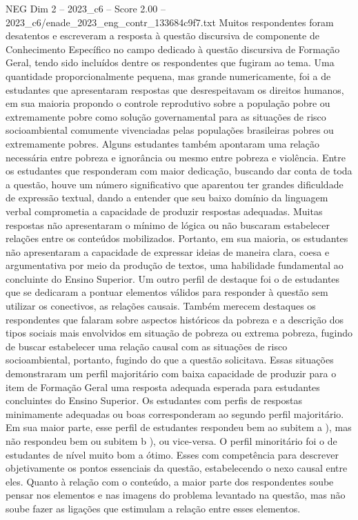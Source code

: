 \begin{textsample}{NEG Dim 2 – 2023\_c6 – Score 2.00 – 2023\_c6/enade\_2023\_eng\_contr\_133684c9f7.txt}
Muitos respondentes foram desatentos e escreveram a resposta à questão discursiva de componente de Conhecimento Específico no campo dedicado à questão discursiva de Formação Geral, tendo sido incluídos dentre os respondentes que fugiram ao tema.
Uma quantidade proporcionalmente pequena, mas grande numericamente, foi a de estudantes que apresentaram respostas que desrespeitavam os direitos humanos, em sua maioria propondo o controle reprodutivo sobre a população pobre ou extremamente pobre como solução governamental para as situações de risco socioambiental comumente vivenciadas pelas populações brasileiras pobres ou extremamente pobres.
Alguns estudantes também apontaram uma relação necessária entre pobreza e ignorância ou mesmo entre pobreza e violência.
Entre os estudantes que responderam com maior dedicação, buscando dar conta de toda a questão, houve um número significativo que aparentou ter grandes dificuldade de expressão textual, dando a entender que seu baixo domínio da linguagem verbal comprometia a capacidade de produzir respostas adequadas.
Muitas respostas não apresentaram o mínimo de lógica ou não buscaram estabelecer relações entre os conteúdos mobilizados.
Portanto, em sua maioria, os estudantes não apresentaram a capacidade de expressar ideias de maneira clara, coesa e argumentativa por meio da produção de textos, uma habilidade fundamental ao concluinte do Ensino Superior.
Um outro perfil de destaque foi o de estudantes que se dedicaram a pontuar elementos válidos para responder à questão sem utilizar os conectivos, as relações causais.
Também merecem destaques os respondentes que falaram sobre aspectos históricos da pobreza e a descrição dos tipos sociais mais envolvidos em situação de pobreza ou extrema pobreza, fugindo de buscar estabelecer uma relação causal com as situações de risco socioambiental, portanto, fugindo do que a questão solicitava.
Essas situações demonstraram um perfil majoritário com baixa capacidade de produzir para o item de Formação Geral uma resposta adequada esperada para estudantes concluintes do Ensino Superior.
Os estudantes com perfis de respostas minimamente adequadas ou boas corresponderam ao segundo perfil majoritário.
Em sua maior parte, esse perfil de estudantes respondeu bem ao subitem a ), mas não respondeu bem ou subitem b ), ou vice-versa.
O perfil minoritário foi o de estudantes de nível muito bom a ótimo.
Esses com competência para descrever objetivamente os pontos essenciais da questão, estabelecendo o nexo causal entre eles.
Quanto à relação com o conteúdo, a maior parte dos respondentes soube pensar nos elementos e nas imagens do problema levantado na questão, mas não soube fazer as ligações que estimulam a relação entre esses elementos.

\end{textsample}

